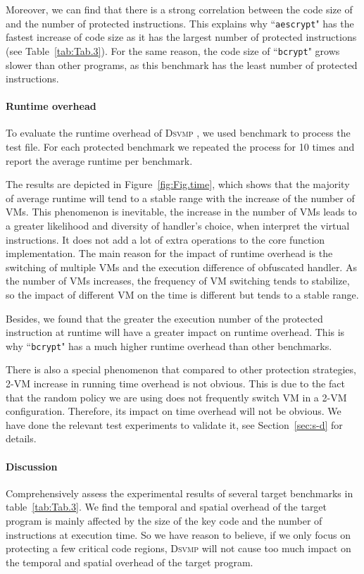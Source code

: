 \documentclass[preprint,12pt,3p]{elsarticle}
\newcommand{\DSVMP}{\textsc{Dsvmp }}
\begin{document}
Moreover, we can find that there is a strong correlation between the code size of and the number of protected instructions.
This explains why ``\texttt{aescrypt}" has the fastest increase of code size as it has
the largest number of protected instructions (see Table~\ref{tab:Tab.3}).
For the same reason, the code size of ``\texttt{bcrypt}" grows slower than other programs,
as this benchmark has the least number of protected instructions.


\paragraph*{Runtime overhead} To evaluate the runtime overhead of \DSVMP, we used benchmark to process the test file.
For each protected benchmark we repeated the process for 10 times and report the average runtime per benchmark.

The results are depicted in Figure~\ref{fig:Fig.time},
which shows that the majority of average runtime will tend to a stable range with the increase of the number of VMs.
This phenomenon is inevitable, the increase in the number of VMs leads to a
greater likelihood and diversity of handler's choice, when interpret the virtual instructions.
It does not add a lot of extra operations to the core function implementation.
The main reason for the impact of runtime overhead is the switching of multiple VMs
and the execution difference of obfuscated handler.
As the number of VMs increases, the frequency of VM switching tends to stabilize,
so the impact of different VM on the time is different but tends to a stable range.

Besides, we found that the greater the execution number of the protected instruction at runtime
will have a greater impact on runtime overhead.
This is why ``\texttt{bcrypt}" has a much higher runtime overhead than other benchmarks.

There is also a special phenomenon that compared to other protection strategies,
2-VM increase in running time overhead is not obvious.
This is due to the fact that the random policy we are using does not frequently switch VM in a 2-VM configuration.
Therefore, its impact on time overhead will not be obvious.
We have done the relevant test experiments to validate it, see Section~\ref{sec:s-d} for details.


\paragraph*{Discussion} 
Comprehensively assess the experimental results of several target benchmarks in table~\ref{tab:Tab.3}. 
We find the temporal and spatial overhead of the target program is mainly affected by 
the size of the key code and the number of instructions at execution time.
So we have reason to believe, if we only focus on protecting a few critical code regions,
\DSVMP will not cause too much impact on the temporal and spatial overhead of the target program.
\end{document}
